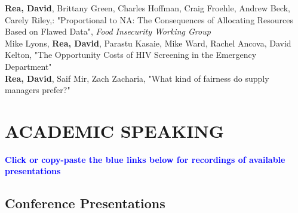 \documentclass[12pt, letter]{moderncv}
\begin{document}
\textbf{Rea, David}, Brittany Green, Charles Hoffman, Craig Froehle, Andrew Beck, Carely Riley,: "Proportional to NA: The Consequences of Allocating Resources Based on Flawed Data", \textit{Food Insecurity Working Group}
\medskip \\
 Mike Lyons, \textbf{Rea, David}, Parastu Kasaie, Mike Ward, Rachel Ancova, David Kelton, "The Opportunity Costs of HIV Screening in the Emergency Department" 
\medskip \\
\textbf{Rea, David}, Saif Mir, Zach Zacharia, "What kind of fairness do supply managers prefer?" 
\section{ACADEMIC SPEAKING}
\textbf{\textcolor{blue}{Click or copy-paste the blue links below for recordings of available presentations}}\\
\smallskip
\subsection{Conference Presentations}
\smallskip



\end{document}
